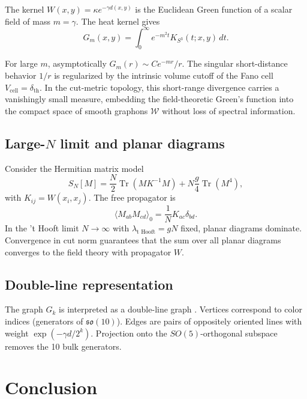 \documentclass[12pt]{article}
\numberwithin{equation}{section}
\newcommand{\dth}{\delta_{\mathrm{th}}}
\begin{document}
The kernel \(W(x,y) = \kappa e^{-\gamma d(x,y)}\) is the Euclidean Green function of a scalar field of mass \(m = \gamma\). The heat kernel gives
\[
G_m(x,y) = \int_0^\infty e^{-m^2 t} K_{S^3}(t;x,y) \, dt. \tag{59}
\]

For large \(m\), asymptotically \(G_m(r) \sim C e^{-m r}/r\). The singular short-distance behavior \(1/r\) is regularized by the intrinsic volume cutoff of the Fano cell \(V_{\text{cell}} = \dth\). In the cut-metric topology, this short-range divergence carries a vanishingly small measure, embedding the field-theoretic Green's function into the compact space of smooth graphons \(\mathcal{W}\) without loss of spectral information.

\subsection{Large-\(N\) limit and planar diagrams}

Consider the Hermitian matrix model
\[
S_N[M] = \frac{N}{2} \operatorname{Tr}(M K^{-1} M) + N \frac{g}{4} \operatorname{Tr}(M^4), \tag{60}
\]
with \(K_{ij} = W(x_i, x_j)\). The free propagator is
\[
\langle M_{ab} M_{cd} \rangle_0 = \frac{1}{N} K_{ac} \delta_{bd}. \tag{61}
\]
In the ’t Hooft limit \(N \to \infty\) with \(\lambda_{\text{t Hooft}} = gN\) fixed, planar diagrams dominate. Convergence in cut norm guarantees that the sum over all planar diagrams converges to the field theory with propagator \(W\).

\subsection{Double-line representation}

The graph \(G_k\) is interpreted as a double-line graph \cite{thooft1974}. Vertices correspond to color indices (generators of \(\mathfrak{so}(10)\)). Edges are pairs of oppositely oriented lines with weight \(\exp(-\gamma d/2^k)\). Projection onto the \(SO(5)\)-orthogonal subspace removes the 10 bulk generators.

\section{Conclusion}
\end{document}
